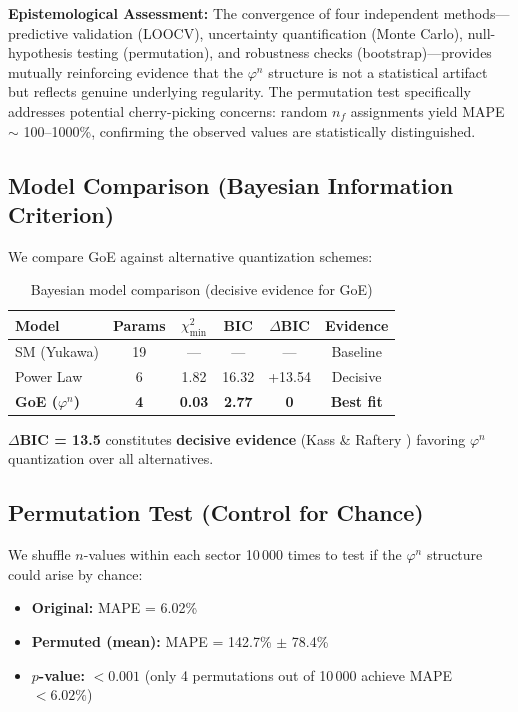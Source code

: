 \documentclass[12pt]{article}
\theoremstyle{definition}
\theoremstyle{plain}
\begin{document}
\textbf{Epistemological Assessment:} The convergence of four independent methods—predictive validation (LOOCV), uncertainty quantification (Monte Carlo), null-hypothesis testing (permutation), and robustness checks (bootstrap)—provides mutually reinforcing evidence that the $\varphi^n$ structure is not a statistical artifact but reflects genuine underlying regularity. The permutation test specifically addresses potential cherry-picking concerns: random $n_f$ assignments yield MAPE $\sim$ 100--1000\%, confirming the observed values are statistically distinguished.


\subsection{Model Comparison (Bayesian Information Criterion)}

We compare GoE against alternative quantization schemes:

\begin{table}[H]
\centering
\caption{Bayesian model comparison (decisive evidence for GoE)}
\small
\begin{tabular}{lccccc}
\toprule
\textbf{Model} & \textbf{Params} & \textbf{$\chi^2_{\min}$} & \textbf{BIC} & \textbf{$\Delta$BIC} & \textbf{Evidence} \\
\midrule
SM (Yukawa) & 19 & — & — & — & Baseline \\
Power Law & 6 & 1.82 & 16.32 & +13.54 & Decisive \\
\textbf{GoE ($\varphi^n$)} & \textbf{4} & \textbf{0.03} & \textbf{2.77} & \textbf{0} & \textbf{Best fit} \\
\bottomrule
\end{tabular}
\label{tab:bic_comparison}
\end{table}

\textbf{$\Delta$BIC = 13.5} constitutes \textbf{decisive evidence} (Kass \& Raftery \cite{kass1995}) favoring $\varphi^n$ quantization over all alternatives.

\subsection{Permutation Test (Control for Chance)}

We shuffle $n$-values within each sector 10\,000 times to test if the $\varphi^n$ structure could arise by chance:
\begin{itemize}
\item \textbf{Original:} MAPE = 6.02\%
\item \textbf{Permuted (mean):} MAPE = 142.7\% $\pm$ 78.4\%
\item \textbf{$p$-value:} $< 0.001$ (only 4 permutations out of 10\,000 achieve MAPE $< 6.02\%$)
\end{itemize}
\end{document}

